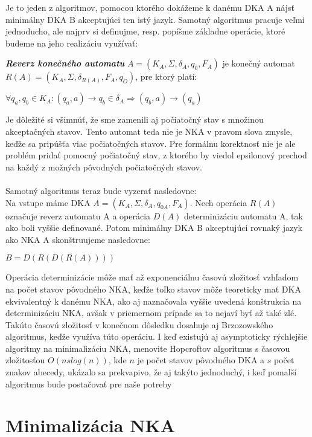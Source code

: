 Je to jeden z algoritmov, pomocou ktorého dokážeme k danému DKA A nájsť minimálny DKA B akceptujúci ten istý jazyk. Samotný algoritmus pracuje veľmi jednoducho, ale najprv si definujme, resp. popíšme základne operácie, ktoré budeme na jeho realizáciu využívať:

\begin{defn}{\textbf {\textit {Reverz konečného automatu}}} $A=(K_A,\Sigma,\delta_A,q_{0},F_A)$ je konečný automat $R(A)=(K_A,\Sigma,\delta_{R(A)},F_A,q_{O})$, pre ktorý platí:
\\
\centerline{$\forall q_a,q_b \in K_A: (q_a,a) \rightarrow q_b \in \delta_A \Rightarrow (q_b,a)\rightarrow(q_a)$}
\end{defn}
Je dôležité si všimnúť, že sme zamenili aj počiatočný stav s množinou akceptačných stavov. Tento automat teda nie je NKA v pravom slova zmysle, keďže sa pripúšťa viac počiatočných stavov. Pre formálnu korektnosť nie je ale problém pridať pomocný počiatočný stav, z ktorého by viedol epsilonový prechod na každý z možných pôvodných počiatočných stavov.
\paragraph{}
Samotný algoritmus teraz bude vyzerať nasledovne:\\
Na vstupe máme DKA $A=(K_A,\Sigma,\delta_A,q_{0A},F_A)$. Nech operácia $R(A)$ označuje reverz automatu A a operácia $D(A)$ determinizáciu automatu A, tak ako boli vyššie definované. Potom minimálny DKA B akceptujúci rovnaký jazyk ako NKA A skonštruujeme nasledovne:
\\
\centerline{$B=D(R(D(R(A))))$}
Operácia determinizácie môže mať až exponenciálnu časovú zložitosť vzhľadom na počet stavov pôvodného NKA, keďže toľko stavov môže teoreticky mať DKA ekvivalentný k danému NKA, ako aj naznačovala vyššie uvedená konštrukcia na determinizáciu NKA, avšak v priemernom prípade sa to nejaví byť až také zlé. Takúto časovú zložitosť v konečnom dôsledku dosahuje aj Brzozowského algoritmus, keďže využíva túto operáciu. I keď existujú aj asymptoticky rýchlejšie algoritmy na minimalizáciu NKA, menovite Hopcroftov algoritmus s časovou zložitosťou $O(nslog(n))$, kde $n$ je počet stavov pôvodného DKA a $s$ počet znakov abecedy, ukázalo sa prekvapivo, že aj takýto jednoduchý, i keď pomalší algoritmus bude postačovať pre naše potreby

\section{Minimalizácia NKA}

